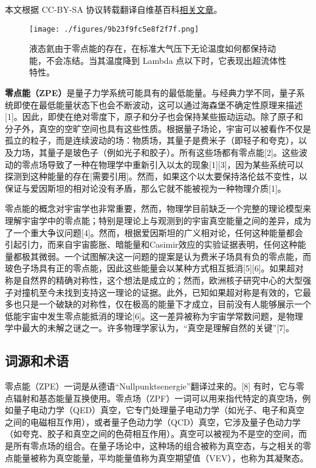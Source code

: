 
本文根据 CC-BY-SA 协议转载翻译自维基百科\href{https://en.wikipedia.org/wiki/Zero-point_energy}{相关文章}。

\begin{figure}[ht]
\centering
\texttt{[image: ./figures/9b23f9fc5e8f2f7f.png]}
\caption{液态氦由于零点能的存在，在标准大气压下无论温度如何都保持动能，不会冻结。当其温度降到 Lambda 点以下时，它表现出超流体性特性。} \label{fig_LD_1}
\end{figure}
\textbf{零点能（ZPE）}是量子力学系统可能具有的最低能量。与经典力学不同，量子系统即使在最低能量状态下也会不断波动，这可以通过海森堡不确定性原理来描述[1]。因此，即使在绝对零度下，原子和分子也会保持某些振动运动。除了原子和分子外，真空的空旷空间也具有这些性质。根据量子场论，宇宙可以被看作不仅是孤立的粒子，而是连续波动的场：物质场，其量子是费米子（即轻子和夸克），以及力场，其量子是玻色子（例如光子和胶子）。所有这些场都有零点能[2]。这些波动的零点场导致了一种在物理学中重新引入以太的现象[1][3]，因为某些系统可以探测到这种能量的存在[需要引用]。然而，如果这个以太要保持洛伦兹不变性，以保证与爱因斯坦的相对论没有矛盾，那么它就不能被视为一种物理介质[1]。

零点能的概念对宇宙学也非常重要，然而，物理学目前缺乏一个完整的理论模型来理解宇宙学中的零点能；特别是理论上与观测到的宇宙真空能量之间的差异，成为了一个重大争议问题[4]。然而，根据爱因斯坦的广义相对论，任何这种能量都会引起引力，而来自宇宙膨胀、暗能量和Casimir效应的实验证据表明，任何这种能量都极其微弱。一个试图解决这一问题的提案是认为费米子场具有负的零点能，而玻色子场具有正的零点能，因此这些能量会以某种方式相互抵消[5][6]。如果超对称是自然界的精确对称性，这个想法是成立的；然而，欧洲核子研究中心的大型强子对撞机至今未找到支持这一理论的证据。此外，已知如果超对称是有效的，它最多也只是一个破缺的对称性，仅在极高的能量下才成立，目前没有人能够展示一个低能宇宙中发生零点能抵消的理论[6]。这一差异被称为宇宙学常数问题，是物理学中最大的未解之谜之一。许多物理学家认为，“真空是理解自然的关键”[7]。
\subsection{词源和术语}  
零点能（ZPE）一词是从德语“Nullpunktsenergie”翻译过来的。[8] 有时，它与零点辐射和基态能量互换使用。零点场（ZPF）一词可以用来指代特定的真空场，例如量子电动力学（QED）真空，它专门处理量子电动力学（如光子、电子和真空之间的电磁相互作用），或者量子色动力学（QCD）真空，它涉及量子色动力学（如夸克、胶子和真空之间的色荷相互作用）。真空可以被视为不是空的空间，而是所有零点场的组合。在量子场论中，这种场的组合被称为真空态，与之相关的零点能量被称为真空能量，平均能量值称为真空期望值（VEV），也称为其凝聚态。
